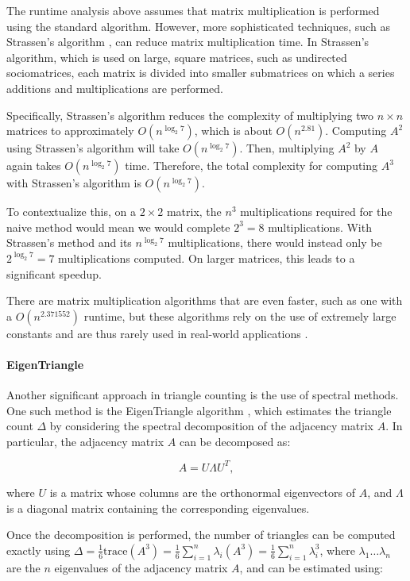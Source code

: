 \documentclass[11pt, margin=1in]{article}
\begin{document}
The runtime analysis above assumes that matrix multiplication is performed using the standard algorithm.
However, more sophisticated techniques, such as Strassen's algorithm \cite{strassen_gaussian_1969}, can reduce matrix multiplication time.
In Strassen's algorithm, which is used on large, square matrices, such as undirected sociomatrices, each matrix is divided into smaller submatrices on which a series additions and multiplications are performed.

Specifically, Strassen's algorithm reduces the complexity of multiplying two $n \times n$ matrices to approximately $O(n^{\log_2 7})$, which is about $O(n^{2.81})$.
Computing $A^2$ using Strassen's algorithm will take $O(n^{\log_2 7})$.
Then, multiplying $A^2$ by $A$ again takes $O(n^{\log_2 7})$ time.
Therefore, the total complexity for computing $A^3$ with Strassen's algorithm is $O(n^{\log_2 7})$.

To contextualize this, on a $2 \times 2$ matrix, the $n^3$ multiplications required for the naive method would mean we would complete $2^3 = 8$ multiplications.
With Strassen's method and its $n^{\log_2 7}$ multiplications, there would instead only be $2^{\log_2 7} = 7$ multiplications computed.
On larger matrices, this leads to a significant speedup.

There are matrix multiplication algorithms that are even faster, such as one with a $O(n^{2.371552})$ runtime, but these algorithms rely on the use of extremely large constants and are thus rarely used in real-world applications \cite{williams_new_2023,williams_multiplying_2012}.

\paragraph{EigenTriangle}

Another significant approach in triangle counting is the use of spectral methods.
One such method is the EigenTriangle algorithm \cite{tsourakakis_fast_2008}, which estimates the triangle count $\Delta$ by considering the spectral decomposition of the adjacency matrix $A$.
In particular, the adjacency matrix $A$ can be decomposed as:

\[
A = U \Lambda U^T,
\]

where $U$ is a matrix whose columns are the orthonormal eigenvectors of $A$, and $\Lambda$ is a diagonal matrix containing the corresponding eigenvalues.

Once the decomposition is performed, the number of triangles can be computed exactly using $\Delta = \frac{1}{6} \mathrm{trace}(A^3) = \frac{1}{6} \sum_{i = 1}^{n} \lambda_i(A^3) = \frac{1}{6} \sum_{i = 1}^{n} \lambda_i^3$, where $\lambda_1 \ldots \lambda_n$ are the $n$ eigenvalues of the adjacency matrix $A$, and can be estimated using:
\end{document}
